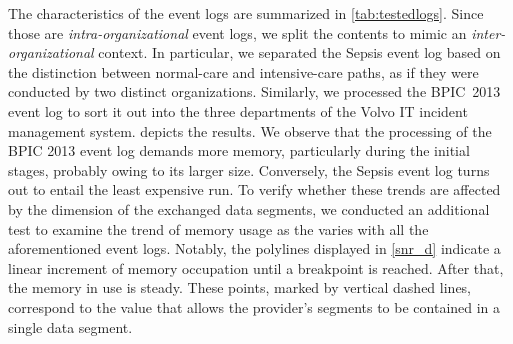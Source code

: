 The characteristics of the event logs are summarized in \cref{tab:testedlogs}.
Since those are \textit{intra-organizational} event logs, we %
split the contents to mimic an \textit{inter-organizational} context.
In particular, we separated the Sepsis event log based on the distinction between normal-care and intensive-care paths, as if they were conducted by two distinct organizations. Similarly, we processed the BPIC~2013 event log to sort it out into the three departments of the Volvo IT incident management system. %
 depicts the results. We observe that the processing of the BPIC 2013 event log demands more memory, particularly during the initial stages, probably owing to its larger size. Conversely, the Sepsis event log turns out to entail the least expensive run. %
To verify whether these trends are affected by the dimension of the exchanged data segments, we conducted an additional test to examine the trend of memory usage as the {\SegSize} varies with all the aforementioned event logs. %
Notably, the polylines displayed in \cref{snr_d} indicate a linear increment of memory occupation until a breakpoint is reached. After that, the memory in use is steady. These points, marked by vertical dashed lines, correspond %
to the {\SegSize} value that allows the provider's segments to be contained in a single data segment.

